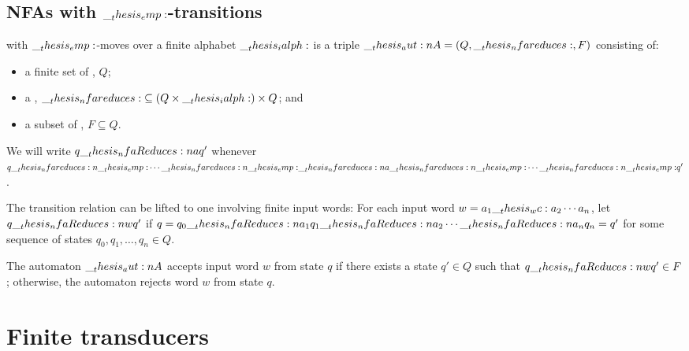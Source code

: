 \subsection{\Aclp*{NFA} with $\__thesis_emp:$-transitions}

\begin{definition}
   with $\__thesis_emp:$-moves over a finite alphabet $\__thesis_ialph:$ is a triple $\aut{A} = (Q, \mathord{\nfareduces}, F)$ consisting of:
  \begin{itemize}
  \item a finite set of , $Q$;
  \item a , $\mathord{\nfareduces} \subseteq (Q \times \ialph) \times Q$; and
  \item a subset of , $F \subseteq Q$.
  \end{itemize}
  We will write $q \nfaReduces[a] q'$ whenever $q \nfareduces[\emp] \dotsb \nfareduces[\emp] \nfareduces[a] \nfareduces[\emp] \dotsb \nfareduces[\emp] q'$.

  The transition relation can be lifted to one involving finite input words: For each input word $w = a_1 \wc a_2 \dotsm a_n$, let $q \nfaReduces[w] q'$ if $q = q_0 \nfaReduces[a_1] q_1 \nfaReduces[a_2] \dotsb \nfaReduces[a_n] q_n = q'$ for some sequence of states $q_0, q_1, \dotsc, q_n \in Q$.

  The automaton $\__thesis_aut:n {A}$ accepts input word $w$ from state $q$ if there exists a state $q' \in Q$ such that $q \nfaReduces[w] q' \in F$;
  otherwise, the automaton rejects word $w$ from state $q$.
\end{definition}

      

\section{Finite transducers}

